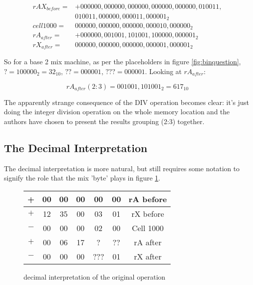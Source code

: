 \documentclass{article}
\begin{document}
\begin{align*}
    rAX_{before} = &+000000,000000,000000,000000,000000,010011,\\
    &010011,000000,000011,000001_2 \\
    cell1000 = &000000,000000,000000,000010,000000_2 \\
    rA_{after} = &+000000,001001,101001,100000,000001_2 \\
    rX_{after} = &000000,000000,000000,000001,000001_2
\end{align*}

So for a base 2 mix machine, as per the placeholders in
figure \ref{fig:binquestion}, $? = 100000_2 = 32_{10}$, $?? = 000001$,
$??? = 000001$.  Looking at $rA_{after}$:

\begin{equation*}
    rA_{after} (2:3) = 001001,101001_2 = 617_{10}
\end{equation*}

The apparently strange consequence of the DIV operation
becomes clear: it's just doing the integer division operation
on the whole memory location and the authors have chosen to
present the results grouping (2:3) together.

\subsection*{The Decimal Interpretation}

The decimal interpretation is more natural, but still requires
some notation to signify the role that the mix 'byte' plays
in figure \ref{fig:decquestion}.

\begin{figure}
    \begin{center}
        \begin{tabular}{|c|c|c|c|c|c|c|}
            \hline
            + & 00 & 00 & 00 & 00 & 00 & rA before \\
            \hline
            $+$ & 12 & 35 & 00 & 03 & 01 & rX before \\
            \hline
            $-$ & 00 & 00 & 00 & 02 & 00 & Cell 1000 \\
            \hline
            $+$ & 00 & 06 & 17 & ? & ?? & rA after \\
            \hline
            $-$ & 00 & 00 & 00 & ??? & 01 & rX after \\
            \hline
        \end{tabular}
    \end{center}
    \caption{decimal interpretation of the original operation}
    \label{fig:decquestion}
\end{figure}
\end{document}
